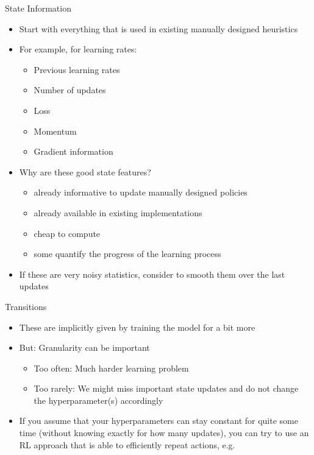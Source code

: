 \begin{frame}[c]{State Information}
	
	\begin{itemize}
	    \item Start with everything that is used in existing manually designed heuristics
	    \item For example, for learning rates:
	    \begin{itemize}
	        \item Previous learning rates
	        \item Number of updates
	        \item Loss
	        \item Momentum
	        \item Gradient information
	    \end{itemize}
	    \medskip
	    \pause
	    \item Why are these good state features?
	    \begin{itemize}
	        \item already informative to update manually designed policies
	        \item already available in existing implementations
	        \item cheap to compute
	        \item some quantify the progress of the learning process
	    \end{itemize}
	    \medskip
	    \pause
	    \item If these are very noisy statistics, consider to smooth them over the last updates
	\end{itemize}
	
\end{frame}
\begin{frame}[c]{Transitions}
	
	\begin{itemize}
	    \item These are implicitly given by training the model for a bit more
	    \item But: Granularity can be important
	    \begin{itemize}
	        \item Too often: Much harder learning problem
	        \item Too rarely: We might miss important state updates and do not change the hyperparameter(s) accordingly
	    \end{itemize}
	    \item If you assume that your hyperparameters can stay constant for quite some time (without knowing exactly for how many updates), you can try to use an RL approach that is able to efficiently repeat actions, e.g. 
	\end{itemize}
	
\end{frame}
